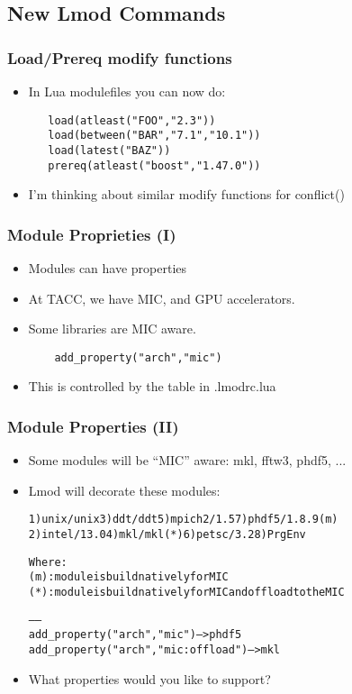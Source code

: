 \documentclass{beamer}
\begin{document}
\subsection{New Lmod Commands}
\label{sec:cmds}

\begin{frame}[fragile]
    \frametitle{Load/Prereq modify functions}
  \begin{itemize}
    \item In Lua modulefiles you can now do:
    {\small
\begin{verbatim}
   load(atleast("FOO","2.3"))
   load(between("BAR","7.1","10.1"))
   load(latest("BAZ"))
   prereq(atleast("boost","1.47.0"))
\end{verbatim}
}
    \item I'm thinking about similar modify functions for conflict()
  \end{itemize}
\end{frame}

\begin{frame}[fragile]
    \frametitle{Module Proprieties (I)}
  \begin{itemize}
    \item Modules can have properties
    \item At TACC, we have MIC, and GPU accelerators.
    \item Some libraries are MIC aware.
    {\small
\begin{verbatim}
    add_property("arch","mic")
\end{verbatim}
}
    \item This is controlled by the table in .lmodrc.lua
  \end{itemize}
\end{frame}

\begin{frame}[fragile]
    \frametitle{Module Properties (II)}
  \begin{itemize}
    \item Some modules will be ``MIC'' aware: mkl, fftw3, phdf5, ...
    \item Lmod will decorate these modules:
  {\tiny
    \begin{alltt}
  1) unix/unix     3) ddt/ddt       5) mpich2/1.5    7) {\color{blue}phdf5/1.8.9 (m)}
  2) intel/13.0    4) {\color{red}mkl/mkl (*)}   6) petsc/3.2     8) PrgEnv

  Where:
   {\color{blue}(m)}:  module is build natively for MIC
   {\color{red}(*)}:  module is build natively for MIC and offload to the MIC

   ------
   add_property("arch","mic")              -- > phdf5
   add_property("arch","mic:offload")      -- > mkl
    \end{alltt}
}
  \item What properties would you like to support?
  \end{itemize}
\end{frame}
\end{document}
